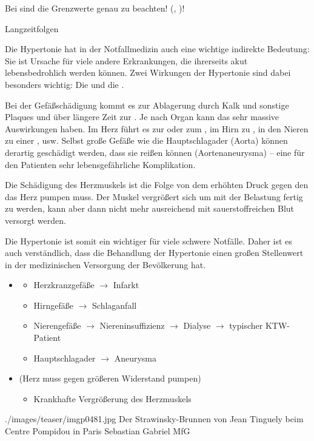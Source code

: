 \begin{Danger}
  \item Bei  sind die Grenzwerte genau zu beachten!
  (, )!
\end{Danger}


\TextSlidePicture
{Langzeitfolgen}%
{%
Die Hypertonie hat in der Notfallmedizin auch eine wichtige
indirekte Bedeutung: Sie ist Ursache für viele andere
Erkrankungen, die ihrerseits akut lebensbedrohlich werden
können.
Zwei Wirkungen der Hypertonie sind dabei besonders wichtig:
Die  und die .

Bei der Gefäßschädigung kommt es zur Ablagerung durch Kalk
und sonstige Plaques und über längere Zeit zur . Je nach Organ kann das sehr
massive Auswirkungen haben. Im Herz führt es zur  oder zum , im Hirn zu
, in den Nieren zu einer
, usw. Selbst große Gefäße wie die
Hauptschlagader (Aorta) können derartig geschädigt werden,
dass sie reißen können (Aortenaneurysma) -- eine für den
Patienten sehr lebensgefährliche Komplikation.

Die Schädigung des Herzmuskels ist die Folge von dem
erhöhten Druck gegen den das Herz pumpen muss. Der Muskel
vergrößert sich um mit der Belastung fertig zu werden, kann
aber dann nicht mehr ausreichend mit sauerstoffreichen Blut
versorgt werden.

Die Hypertonie ist somit ein wichtiger
 für viele schwere Notfälle. Daher ist
es auch verständlich, dass die Behandlung der Hypertonie
einen großen Stellenwert in der medizinischen Versorgung der
Bevölkerung hat.}%
{
\begin{itemize}
  \item {}
  \begin{itemize}
    \item Herzkranzgefäße ${\rightarrow}$ Infarkt
    \item Hirngefäße ${\rightarrow}$ Schlaganfall
    \item Nierengefäße ${\rightarrow}$ Niereninsuffizienz ${\rightarrow}$
    Dialyse ${\rightarrow}$ typischer KTW-Patient
    \item Hauptschlagader ${\rightarrow}$ Aneurysma
  \end{itemize}
  \item {} \par  (Herz muss gegen
  größeren Widerstand pumpen)
  \begin{itemize}
    \item Krankhafte Vergrößerung des Herzmuskels
  \end{itemize}
\end{itemize}}%
{./images/teaser/imgp0481.jpg}%
{%
Der Strawinsky-Brunnen von Jean Tinguely beim Centre Pompidou in Paris %
}%
{}%
{Sebastian Gabriel}%
{MfG}%


